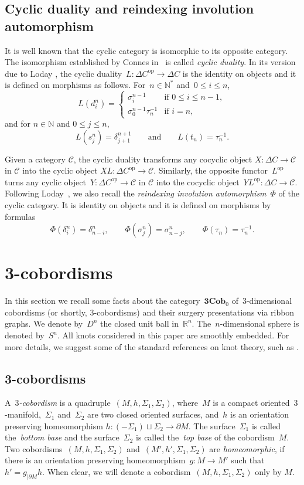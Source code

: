 \documentclass[pdftex]{sigma}
\numberwithin{equation}{section}
\newcommand{\co}{\colon}
\newcommand{\mc}{\mathcal}
\newcommand{\opp}{\mathrm{op}}
\newcommand{\N}{\mathbb{N}}
\newcommand{\R}{\mathbb{R}}
\newcommand{\Cob}{\textbf{Cob}}
\begin{document}
\subsection{Cyclic duality and reindexing involution automorphism} \label{connes loday dual}
It is well known that the cyclic category is isomorphic to its opposite category. The isomorphism established by Connes in~\cite{Connesext} is called \textit{cyclic duality}.
In its version due to Loday \cite[Proposition~6.1.11]{loday98}, the cyclic duality~$L \co \Delta C^\opp \to \Delta C$ is the identity on objects and it is defined on morphisms as follows.
For~$n\in \N^*$ and~$0\leq i \leq n$,
\[L(d_i^n)=
\begin{cases}
\sigma_i^{n-1} & \text{if } 0\leq i \leq n-1, \\
\sigma_0^{n-1}\tau_{n}^{-1} & \text{if } i=n,
\end{cases}\]
and for $n\in \N$ and $0\leq j \leq n$,
\[L(s_j^n)=\delta_{j+1}^{n+1} \qquad \text{and} \qquad L(t_n)=\tau_n^{-1}.\]

Given a category $\mc C$, the cyclic duality transforms any cocyclic object $X \co \Delta C \to {\mc C}$ in $\mc C$ into the cyclic object $XL\co \Delta C^\opp \to \mc C$. Similarly, the opposite functor~$L^\opp$ turns any cyclic object~$Y \co \Delta C^\opp \to \mc C$ in $\mc C$ into the cocyclic object~$YL^\opp \co \Delta C \to {\mc C}$.
Following Loday~\cite[Sec\-tion~6.1.14]{loday98}, we also recall the \textit{reindexing involution automorphism}~$\Phi$ of the cyclic category. It is identity on objects and it is defined on morphisms by formulas
\[\Phi(\delta_i^n)=\delta_{n-i}^n, \qquad \Phi(\sigma_j^n)=\sigma_{n-j}^n, \qquad \Phi(\tau_n)= \tau_n^{-1}.
\]

\section{3-cobordisms} \label{seccobs}
In this section we recall some facts about the category~$\textbf{3}\Cob_0$ of~$3$-dimensional cobordisms (or shortly, $3$-cobordisms) and their surgery presentations via ribbon graphs.
We denote by~$D^n$ the closed unit ball in~$\R^n$. The~$n$-dimensional sphere is denoted by~$S^n$.
All knots considered in this paper are smoothly embedded. For more details, we suggest some of the standard references on knot theory, such as \cite{burde2002knots, lickorish97}.

\subsection{3-cobordisms}
A~\emph{$3$-cobordism} is a quadruple~$(M,h,\Sigma_1,\Sigma_2)$, where~$M$ is a compact oriented~$3$-manifold,~$\Sigma_1$ and~$\Sigma_2$ are two closed oriented surfaces, and~$h$ is an orientation preserving homeomorphism $h\co (-\Sigma_1) \sqcup \Sigma_2 \to \partial M$. The surface~$\Sigma_1$ is called the~\textit{bottom base} and the surface~$\Sigma_2$ is called the~\textit{top base} of the cobordism~$M$.
Two cobordisms~$(M,h,\Sigma_1,\Sigma_2)$ and~$(M',h',\Sigma_1,\Sigma_2)$ are \textit{homeomorphic}, if there is an orientation preserving homeomorphism~$g\co M\to M'$ such that~$h'=g_{\vert\partial M}h$.
When clear, we will denote a cobordism~$(M,h,\Sigma_1,\Sigma_2)$ only by $M$.
\end{document}
